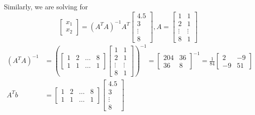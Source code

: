 \documentclass[letter]{article}
\newenvironment{menumerate}{\edef\backupindent{\the\parindent}
  \enumerate\setlength{\parindent}{\backupindent}}
  {\endenumerate}
\begin{document}
\begin{menumerate}
\begin{menumerate}
        Similarly, we are solving for
        \begin{equation*}
            \begin{bmatrix}
                x_1\\x_2
            \end{bmatrix}
            = (A^TA)^{-1}A^T
            \begin{bmatrix}
                4.5\\3\\\vdots\\8
            \end{bmatrix},
            A =
            \begin{bmatrix}
                1&1\\2&1\\\vdots&\vdots\\8&1
            \end{bmatrix}
        \end{equation*}
        \begin{equation*}
        \begin{aligned}
            (A^TA)^{-1} &=
            (\begin{bmatrix}
                1&2&\dots&8\\1&1&\dots&1
            \end{bmatrix}
            \begin{bmatrix}
                1&1\\2&1\\\vdots&\vdots\\8&1
            \end{bmatrix})^{-1}
            = \begin{bmatrix}
                204&36\\36&8
            \end{bmatrix}^{-1}
            = \frac{1}{84}
            \begin{bmatrix}
                2&-9\\-9&51
            \end{bmatrix}
            \\
            A^Tb &=
            \begin{bmatrix}
                1&2&\dots&8\\1&1&\dots&1
            \end{bmatrix}
            \begin{bmatrix}
                4.5\\3\\\vdots\\8

\end{bmatrix}
\end{aligned}
\end{equation*}
\end{menumerate}
\end{menumerate}
\end{document}
